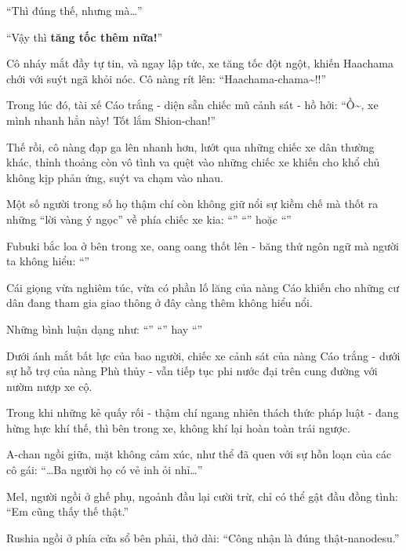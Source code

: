 \documentclass[../main.tex]{subfiles}
\begin{document}
``Thì đúng thế, nhưng mà\dots''

``Vậy thì \textbf{tăng tốc thêm nữa!}''

Cô nháy mắt đầy tự tin, và ngay lập tức, xe tăng tốc đột ngột, khiến Haachama chới với suýt ngã khỏi nóc. Cô nàng rít lên: ``Haachama-chama\~{}!!''

Trong lúc đó, tài xế Cáo trắng - diện sẵn chiếc mũ cảnh sát - hồ hởi: ``Ồ\~{}, xe mình nhanh hẳn này! Tốt lắm Shion-chan!''

Thế rồi, cô nàng đạp ga lên nhanh hơn, lướt qua những chiếc xe dân thường khác, thỉnh thoảng còn vô tình va quệt vào những chiếc xe khiến cho khổ chủ không kịp phản ứng, suýt va chạm vào nhau.

Một số người trong số họ thậm chí còn không giữ nổi sự kiềm chế mà thốt ra những ``lời vàng ý ngọc'' về phía chiếc xe kia: ``'' ``'' hoặc ``''

Fubuki bắc loa ở bên trong xe, oang oang thốt lên - băng thứ ngôn ngữ mà người ta không hiểu: ``''

Cái giọng vừa nghiêm túc, vừa có phần lố lăng của nàng Cáo khiến cho những cư dân đang tham gia giao thông ở đây càng thêm không hiểu nổi.

Những bình luận dạng như: ``'' ``'' hay ``''

Dưới ánh mắt bất lực của bao người, chiếc xe cảnh sát của nàng Cáo trắng - dưới sự hỗ trợ của nàng Phù thủy - vẫn tiếp tục phi nước đại trên cung đường với nườm nượp xe cộ.

Trong khi những kẻ quấy rối - thậm chí ngang nhiên thách thức pháp luật - đang hừng hực khí thế, thì bên trong xe, không khí lại hoàn toàn trái ngược.

A-chan ngồi giữa, mặt không cảm xúc, như thể đã quen với sự hỗn loạn của các cô gái: ``\dots Ba người họ có vẻ inh ỏi nhỉ\dots''

Mel, người ngồi ở ghế phụ, ngoảnh đầu lại cười trừ, chỉ có thể gật đầu đồng tình: ``Em cũng thấy thế thật.''

Rushia ngồi ở phía cửa sổ bên phải, thở dài: ``Công nhận là đúng thật-nanodesu.''
\end{document}
